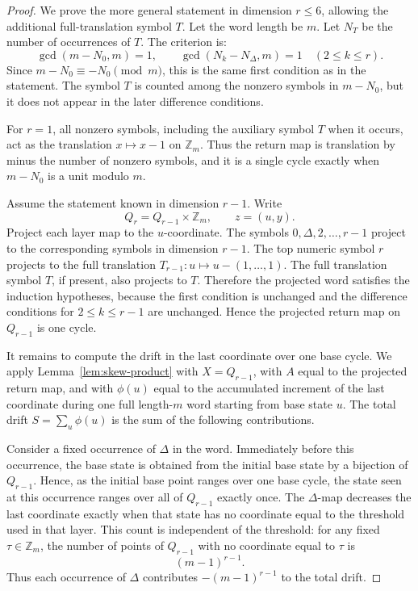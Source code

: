 \documentclass[11pt]{article}
\theoremstyle{definition}
\begin{document}
\begin{proof}
We prove the more general statement in dimension \(r\le6\), allowing the additional full-translation
symbol \(T\).  Let the word length be \(m\).  Let \(N_T\) be the number of occurrences of \(T\).  The
criterion is:
\[
\gcd(m-N_0,m)=1,
\qquad
\gcd(N_k-N_\Delta,m)=1\quad(2\le k\le r).
\]
Since \(m-N_0\equiv -N_0\pmod m\), this is the same first condition as in the statement.  The symbol
\(T\) is counted among the nonzero symbols in \(m-N_0\), but it does not appear in the later
difference conditions.

For \(r=1\), all nonzero symbols, including the auxiliary symbol \(T\) when it occurs, act as the translation \(x\mapsto x-1\) on \(\mathbb Z_m\).  Thus the
return map is translation by minus the number of nonzero symbols, and it is a single cycle exactly when
\(m-N_0\) is a unit modulo \(m\).

Assume the statement known in dimension \(r-1\).  Write
\[
Q_r=Q_{r-1}\times\mathbb Z_m,
\qquad z=(u,y).
\]
Project each layer map to the \(u\)-coordinate.  The symbols \(0,\Delta,2,\ldots,r-1\) project to the
corresponding symbols in dimension \(r-1\).  The top numeric symbol \(r\) projects to the full
translation \(T_{r-1}:u\mapsto u-(1,\ldots,1)\).  The full translation symbol \(T\), if present, also projects to
\(T\).  Therefore the projected word satisfies the induction hypotheses, because the first condition is
unchanged and the difference conditions for \(2\le k\le r-1\) are unchanged.  Hence the projected
return map on \(Q_{r-1}\) is one cycle.

It remains to compute the drift in the last coordinate over one base cycle.  We apply Lemma~\ref{lem:skew-product} with \(X=Q_{r-1}\), with \(A\) equal to the projected return map, and with \(\phi(u)\) equal to the accumulated increment of the last coordinate during one full length-\(m\) word starting from base state \(u\).  The total drift \(S=\sum_u\phi(u)\) is the sum of the following contributions.

Consider a fixed occurrence of \(\Delta\) in the word.  Immediately before this occurrence, the base state is obtained from the initial base state by a bijection of \(Q_{r-1}\).  Hence, as the initial base point ranges over one base cycle, the state seen at this occurrence ranges over all of \(Q_{r-1}\) exactly once.  The \(\Delta\)-map decreases the last coordinate exactly when that state has no coordinate equal to the threshold used in that layer.  This count is independent of the threshold: for any fixed \(\tau\in\mathbb Z_m\), the number of points of \(Q_{r-1}\) with no coordinate equal to \(\tau\) is
\[
(m-1)^{r-1}.
\]
Thus each occurrence of \(\Delta\) contributes \(-(m-1)^{r-1}\) to the total drift.


\end{proof}
\end{document}
